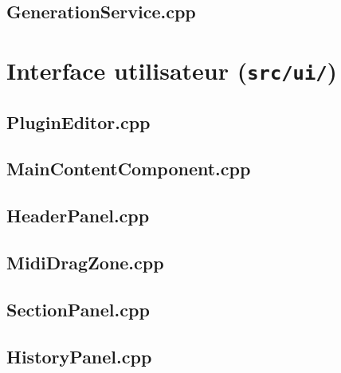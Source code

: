 \subsection{GenerationService.cpp}


\newpage
\section{Interface utilisateur (\texttt{src/ui/})}

\subsection{PluginEditor.cpp}


\subsection{MainContentComponent.cpp}


\subsection{HeaderPanel.cpp}


\subsection{MidiDragZone.cpp}


\subsection{SectionPanel.cpp}


\subsection{HistoryPanel.cpp}


